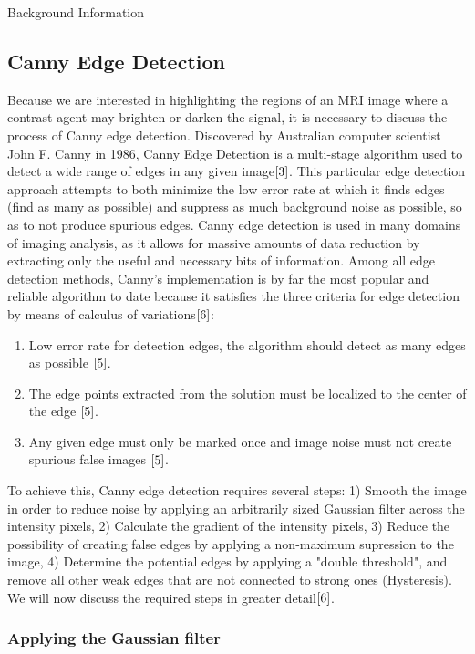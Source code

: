\documentclass[a4paper,12pt]{article}
\begin{document}
\begin{section}{Background Information}
\subsection{Canny Edge Detection}

Because we are interested in highlighting the regions of an MRI image where a contrast agent may brighten or darken the signal, it is necessary to discuss the process of Canny edge detection. Discovered by Australian computer scientist John F. Canny in 1986, Canny Edge Detection is a multi-stage algorithm used to detect a wide range of edges in any given image$\cite{3}$.%
This particular edge detection approach attempts to both minimize the low error rate at which it finds edges (find as many as possible) and suppress as much background noise as possible, so as to not produce spurious edges. Canny edge detection is used in many domains of imaging analysis, as it allows for massive amounts of data reduction by extracting only the useful and necessary bits of information. Among all edge detection methods, Canny's implementation is by far the most popular and reliable algorithm to date because it satisfies the three criteria for edge detection by means of calculus of variations$\cite{6}$:\\%

\singlespacing
\begin{enumerate}
\item Low error rate for detection edges, the algorithm should detect as many edges as possible  $\cite{5}$.
\item The edge points extracted from the solution must be localized to the center of the edge  $\cite{5}$.
\item Any given edge must only be marked once and image noise must not create spurious false images  $\cite{5}$.
\end{enumerate}
\doublespacing

To achieve this, Canny edge detection requires several steps: 1) Smooth the image in order to reduce noise by applying an arbitrarily sized Gaussian filter across the intensity pixels, 2) Calculate the gradient of the intensity pixels, 3) Reduce the possibility of creating false edges by applying a non-maximum supression to the image, 4) Determine the potential edges by applying a "double threshold", and remove all other weak edges that are not connected to strong ones (Hysteresis). We will now discuss the required steps in greater detail$\cite{6}$.%

\subsubsection{Applying the Gaussian filter}


\end{section}
\end{document}
